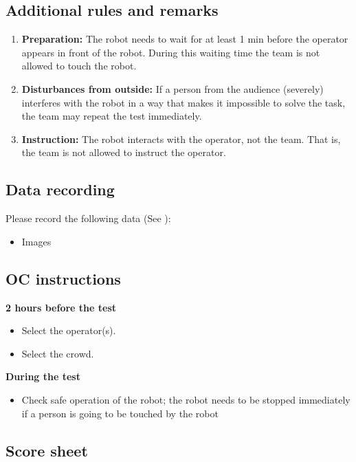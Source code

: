 \subsection{Additional rules and remarks}
\begin{enumerate}
\item \textbf{Preparation:} The robot needs to wait for at least 1 min before the operator appears in front of the robot. During this waiting time the team is not allowed to touch the robot.
\item \textbf{Disturbances from outside:} If a person from the audience (severely) interferes with the robot in a way that makes it impossible to solve the task, the team may repeat the test immediately.
\item \textbf{Instruction:} The robot interacts with the operator, not the team. That is, the team is not allowed to instruct the operator.
\end{enumerate}

\subsection{Data recording}
  Please record the following data (See ):
  \begin{itemize}
   \item Images
  \end{itemize}


%

\subsection{OC instructions}

\textbf{2 hours before the test}
\begin{itemize}
\item Select the  operator(s).
\item Select the crowd.
\end{itemize}

\textbf{During the test}
\begin{itemize}
\item Check safe operation of the robot; the robot needs to be stopped immediately if a person is going to be touched by the robot
\end{itemize}

\subsection{Score sheet}


